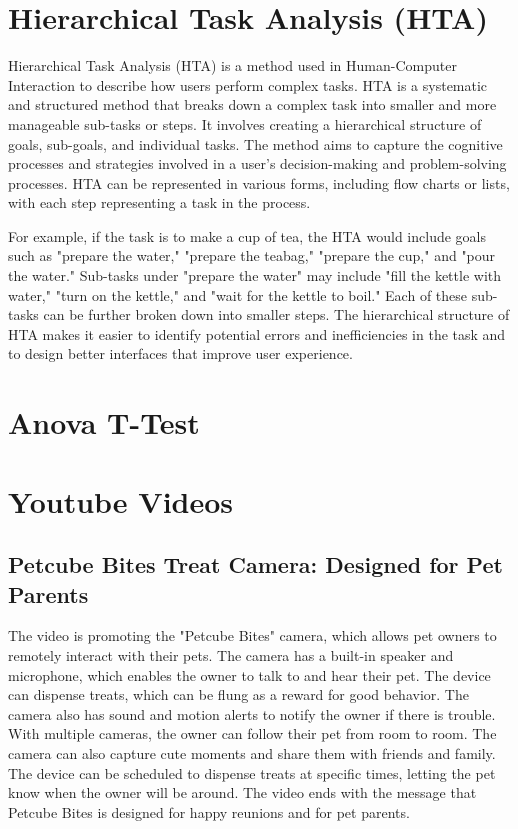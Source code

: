 \documentclass{article}
\begin{document}
\section{Hierarchical Task Analysis (HTA)}
Hierarchical Task Analysis (HTA) is a method used in Human-Computer Interaction to describe how users perform complex tasks. HTA is a systematic and structured method that breaks down a complex task into smaller and more manageable sub-tasks or steps. It involves creating a hierarchical structure of goals, sub-goals, and individual tasks. The method aims to capture the cognitive processes and strategies involved in a user's decision-making and problem-solving processes. HTA can be represented in various forms, including flow charts or lists, with each step representing a task in the process.

For example, if the task is to make a cup of tea, the HTA would include goals such as "prepare the water," "prepare the teabag," "prepare the cup," and "pour the water." Sub-tasks under "prepare the water" may include "fill the kettle with water," "turn on the kettle," and "wait for the kettle to boil." Each of these sub-tasks can be further broken down into smaller steps. The hierarchical structure of HTA makes it easier to identify potential errors and inefficiencies in the task and to design better interfaces that improve user experience.

\section{Anova T-Test}



\section{Youtube Videos}
\subsection{Petcube Bites Treat Camera: Designed for Pet Parents}
The video is promoting the "Petcube Bites" camera, which allows pet owners to remotely interact with their pets. The camera has a built-in speaker and microphone, which enables the owner to talk to and hear their pet. The device can dispense treats, which can be flung as a reward for good behavior. The camera also has sound and motion alerts to notify the owner if there is trouble. With multiple cameras, the owner can follow their pet from room to room. The camera can also capture cute moments and share them with friends and family. The device can be scheduled to dispense treats at specific times, letting the pet know when the owner will be around. The video ends with the message that Petcube Bites is designed for happy reunions and for pet parents.
\end{document}
